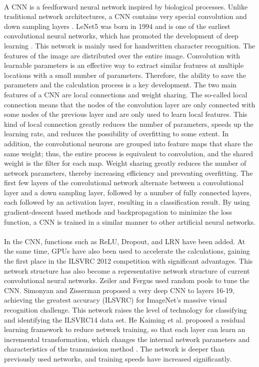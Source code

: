 \documentclass[a4paper,12pt]{report}
\begin{document}
\paragraph{}
A CNN is a feedforward neural network inspired by biological processes. Unlike traditional network architectures, a CNN contains very special convolution and down sampling layers \cite{Cire}. LeNet5 was born in 1994 and is one of the earliest convolutional neural networks, which has promoted the development of deep learning \cite{Le}. This network is mainly used for handwritten character recognition. The features of the image are distributed over the entire image. Convolution with learnable parameters is an effective way to extract similar features at multiple locations with a small number of parameters. Therefore, the ability to save the parameters and the calculation process is a key development. The two main features of a CNN are local connections and weight sharing. The so-called local connection means that the nodes of the convolution layer are only connected with some nodes of the previous layer and are only used to learn local features. This kind of local connection greatly reduces the number of parameters, speeds up the learning rate, and reduces the possibility of overfitting to some extent. In addition, the convolutional neurons are grouped into feature maps that share the same weight; thus, the entire process is equivalent to convolution, and the shared weight is the filter for each map. Weight sharing greatly reduces the number of network parameters, thereby increasing efficiency and preventing overfitting. The first few layers of the convolutional network alternate between a convolutional layer and a down sampling layer, followed by a number of fully connected layers, each followed by an activation layer, resulting in a classification result. By using gradient-descent based methods and backpropagation to minimize the loss function, a CNN is trained in a similar manner to other artificial neural networks.

\paragraph{}
In the CNN, functions such as ReLU, Dropout, and LRN have been added. At the same time, GPUs have also been used to accelerate the calculations, gaining the first place in the ILSVRC 2012 competition with significant advantages. This network structure has also become a representative network structure of current convolutional neural networks. Zeiler and Fergus used random pools to tune the CNN. Simonyan and Zisserman proposed a very deep CNN to layers 16-19, achieving the greatest accuracy (ILSVRC) for ImageNet’s massive visual recognition challenge.
This network raises the level of technology for classifying and identifying the ILSVRC14 data set. He Kaiming et al. proposed a residual learning framework to reduce network training, so that each layer can learn an incremental transformation, which changes the internal network parameters and characteristics of the transmission method \cite{He,Xie}.
The network is deeper than previously used networks, and training speeds have increased significantly.
\end{document}
